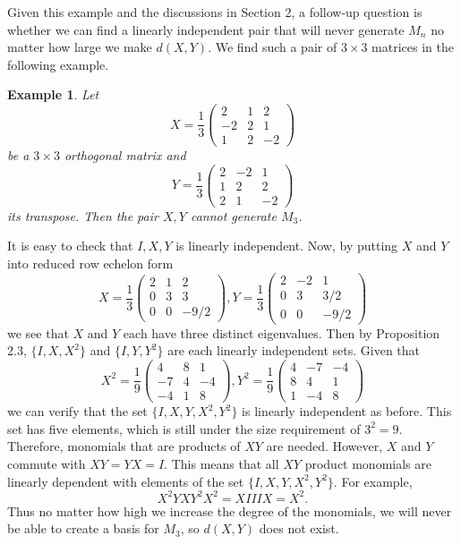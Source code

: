 \documentclass[11pt]{amsart}
\numberwithin{equation}{section}
\numberwithin{figure}{section}
\numberwithin{theorem}{section}
\newtheorem{example}{Example}
\begin{document}
Given this example and the discussions in Section 2, a follow-up question is whether we can find a linearly independent pair that will never generate $M_n$ no matter how large we make $d(X,Y)$. We find such a pair of $3\times3$ matrices in the following example. 
\begin{example}
Let $$X=\frac{1}{3}\begin{pmatrix}2&1&2\\-2&2&1\\1&2&-2\end{pmatrix}$$ be a $3\times 3$ orthogonal matrix and $$Y=\frac{1}{3}\begin{pmatrix}2&-2&1\\1&2&2\\2&1&-2\end{pmatrix}$$ its transpose. Then the pair $X,Y$ cannot generate $M_3$. 
\end{example}
It is easy to check that $I,X,Y$ is linearly independent. Now, by putting $X$ and $Y$ into reduced row echelon form $$X=\frac{1}{3}\begin{pmatrix}2&1&2\\0&3&3\\0&0&-9/2\end{pmatrix}, Y=\frac{1}{3}\begin{pmatrix}2&-2&1\\0&3&3/2\\0&0&-9/2\end{pmatrix}$$ we see that $X$ and $Y$ each have three distinct eigenvalues. Then by Proposition 2.3, $\{I,X,X^2\}$ and $\{I,Y,Y^2\}$ are each linearly independent sets. Given that $$X^2=\frac{1}{9}\begin{pmatrix}4&8&1\\-7&4&-4\\-4&1&8\end{pmatrix}, Y^2=\frac{1}{9}\begin{pmatrix}4&-7&-4\\8&4&1\\1&-4&8\end{pmatrix}$$ we can verify that the set $\{I,X,Y,X^2,Y^2\}$ is linearly independent as before. This set has five elements, which is still under the size requirement of $3^2=9$. Therefore, monomials that are products of $XY$ are needed. However, $X$ and $Y$ commute with $XY=YX=I$. This means that all $XY$ product monomials are linearly dependent with elements of the set $\{I,X,Y,X^2,Y^2\}$. For example, $$X^2YXY^2X^2=XIIIX=X^2.$$ Thus no matter how high we increase the degree of the monomials, we will never be able to create a basis for $M_3$, so $d(X,Y)$ does not exist. 
\end{document}
